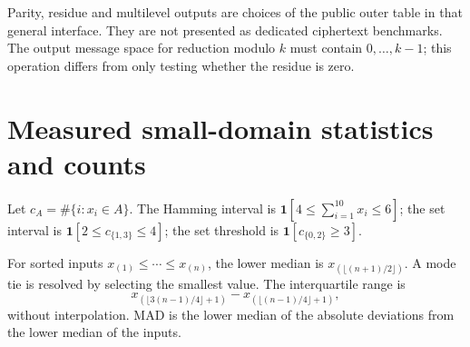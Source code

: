 \documentclass[a4paper,10pt]{article}
\newcommand{\ind}{\mathbf{1}}
\begin{document}
Parity, residue and multilevel outputs are choices of the public outer table in that general interface. They are not presented as dedicated ciphertext benchmarks. The output message space for reduction modulo $k$ must contain $0,\ldots,k-1$; this operation differs from only testing whether the residue is zero.

\newpage
\section{Measured small-domain statistics and counts}
Let $c_A=\#\{i:x_i\in A\}$. The Hamming interval is $\ind[4\le\sum_{i=1}^{10}x_i\le6]$; the set interval is $\ind[2\le c_{\{1,3\}}\le4]$; the set threshold is $\ind[c_{\{0,2\}}\ge3]$.

For sorted inputs $x_{(1)}\le\cdots\le x_{(n)}$, the lower median is $x_{(\lfloor(n+1)/2\rfloor)}$. A mode tie is resolved by selecting the smallest value. The interquartile range is
\[
x_{(\lfloor3(n-1)/4\rfloor+1)}-x_{(\lfloor(n-1)/4\rfloor+1)},
\]
without interpolation. MAD is the lower median of the absolute deviations from the lower median of the inputs.
\end{document}
